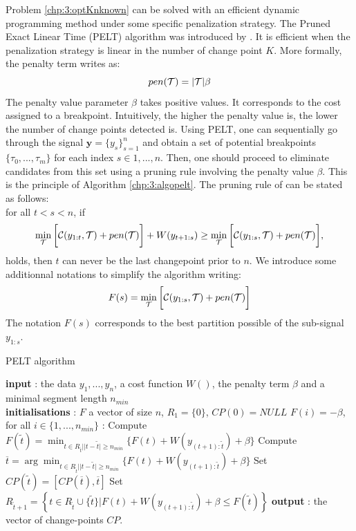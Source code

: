 Problem \ref{chp:3:optKnknown} can be solved with an efficient dynamic programming method under some specific penalization strategy. The Pruned Exact Linear Time (PELT) algorithm was introduced by \cite{Killick2012}. It is efficient when the penalization strategy is linear in the number of change point $K$. More formally, the penalty term writes as:
$$pen({\mathcal T}) = \lvert{\mathcal T}\rvert\beta$$ 
The penalty value parameter $\beta$ takes positive values. It corresponds to the cost assigned to a breakpoint. Intuitively, the higher the penalty value is, the lower the number of change points detected is. Using PELT, one can sequentially go through the signal $\bm y = \{y_s\}_{s=1}^n$ and obtain a set of potential breakpoints $\{\tau_0,...,\tau_m\}$ for each index $s \in {1,...,n}$. Then, one should proceed to eliminate candidates from this set using a pruning rule involving the penalty value $\beta$. This is the principle of Algorithm \ref{chp:3:algopelt}. The pruning rule of \cite{Killick2012} can be stated as follows: \\
 for all $t <s < n$, if
\begin{equation}\label{chp:3:pruning}
 \min_{{\mathcal T}}\bigg[{\mathcal C}(y_{1:t},{\mathcal T})+pen({\mathcal T})\bigg] + W(y_{t+1:s}) \geq \min_{{\mathcal T}}\bigg[{\mathcal C}(y_{1:s},{\mathcal T})+pen({\mathcal T})\bigg], 
\end{equation}
holds, then $t$ can never be the last changepoint prior to $n$. We introduce some additionnal notations to simplify the algorithm writing:  
$$F(s) = \min_{{\mathcal T}}\bigg[{\mathcal C}(y_{1:s},{\mathcal T})+pen({\mathcal T})\bigg]$$
The notation $F(s)$ corresponds to the best partition possible of the sub-signal $y_{1:s}$. 
\begin{algorithm}[ht]
\caption{PELT algorithm}\label{chp:3:algopelt}
\begin{algorithmic}
\State \textbf{input} : the data $y_{1},...,y_{n}$, a cost function $W()$, the penalty term $\beta$ and a minimal segment length $n_{min}$ \\
  \State \textbf{initialisations} : $F$ a vector of size $n$, $R_{1}=\lbrace 0\rbrace$, $CP(0)=NULL$  
  \State $F(i) = -\beta$, for all $i \in \{1,...,n_{min}\}$
   :
  \State Compute 
  $ F(\tilde t)=\min_{t\in R_{\tilde t}\vert \lvert t-\tilde{t}\rvert \geq n_{min}}\lbrace F(t)+W(y_{(t+1):\tilde t})+\beta\rbrace $
  \State Compute $ \overline t=\arg \min_{t\in R_{\tilde t}\vert \lvert t-\tilde{t}\rvert \geq n_{min}}\lbrace F(t)+W(y_{(t+1):\tilde t})+\beta\rbrace $ 
  \State Set $CP(\tilde t)=[CP(\overline t), \overline t]$
  \State Set $R_{\tilde t+1}=\left\{t\in R_{\tilde t}\cup \lbrace\tilde t\rbrace \vert F(t)+W(y_{(t+1):\tilde t}) +\beta \le F(\tilde t)   \right\}$ 
\EndFor 
\State \textbf{output} : the vector of change-points $CP$. 
\end{algorithmic}
\end{algorithm} 

